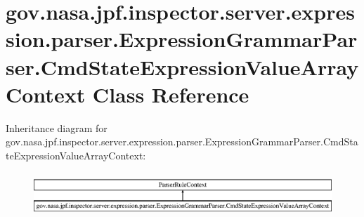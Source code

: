 \hypertarget{classgov_1_1nasa_1_1jpf_1_1inspector_1_1server_1_1expression_1_1parser_1_1_expression_grammar_pa4110664045d2bee8d9164488bf2614d4}{}\section{gov.\+nasa.\+jpf.\+inspector.\+server.\+expression.\+parser.\+Expression\+Grammar\+Parser.\+Cmd\+State\+Expression\+Value\+Array\+Context Class Reference}
\label{classgov_1_1nasa_1_1jpf_1_1inspector_1_1server_1_1expression_1_1parser_1_1_expression_grammar_pa4110664045d2bee8d9164488bf2614d4}
Inheritance diagram for gov.\+nasa.\+jpf.\+inspector.\+server.\+expression.\+parser.\+Expression\+Grammar\+Parser.\+Cmd\+State\+Expression\+Value\+Array\+Context\+:\begin{figure}[H]
\begin{center}
\leavevmode
\includegraphics[height=1.659259cm]{classgov_1_1nasa_1_1jpf_1_1inspector_1_1server_1_1expression_1_1parser_1_1_expression_grammar_pa4110664045d2bee8d9164488bf2614d4}
\end{center}
\end{figure}
